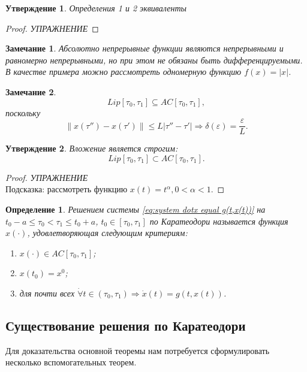 \documentclass[12pt, a4paper]{article}
\theoremstyle{rusdef}
\newtheorem{define}{Определение} %
\newtheorem{statement}{Утверждение}
\newtheorem{remark}{Замечание}
\newcommand\abs[1]{\left\lvert #1 \right\rvert} %
\newcommand{\norm}[1]{\left\lVert #1 \right\rVert} %
\begin{document}
\begin{statement}
Определения 1 и 2 эквиваленты
\end{statement}
\begin{proof}
\textit{УПРАЖНЕНИЕ}
\end{proof}

\begin{remark}
Абсолютно непрерывные функции являются непрерывными и равномерно непрерывными, но при этом не обязаны быть дифференцируемыми. В качестве примера можно рассмотреть одномерную функцию $f(x) = \abs{x}$.
\end{remark}

\begin{remark}
$$
Lip[\tau_0, \tau_1] \subseteq AC[\tau_0, \tau_1],
$$
поскольку
$$
\norm{x(\tau'') - x(\tau')} \leqslant L \abs{\tau'' - \tau'} \Rightarrow \delta(\varepsilon) = \frac{\varepsilon}{L}.
$$
\end{remark}

\begin{statement}
Вложение является строгим:
$$
Lip[\tau_0, \tau_1] \subset AC[\tau_0, \tau_1].
$$
\end{statement}
\begin{proof}
\textit{УПРАЖНЕНИЕ}\\
Подсказка: рассмотреть функцию $x(t) = t^{\alpha}, 0 < \alpha < 1$.
\end{proof}

\begin{define}
Решением системы \eqref{eq:system dotx equal g(t,x(t))} на $t_0 - a \leqslant \tau_0 < \tau_1 \leqslant t_0 + a$, $t_0 \in [\tau_0, \tau_1]$ по Каратеодори называется функция $x(\cdot)$, удовлетворяющая следующим критериям:
\begin{enumerate}
\item $x(\cdot) \in AC[\tau_0, \tau_1]$;
\item $x(t_0) = x^0$;
\item для почти всех $\dot{\forall} t \in (\tau_0, \tau_1) \Rightarrow \dot{x}(t) = g(t, x(t))$.
\end{enumerate}
\end{define}

\subsection*{Существование решения по Каратеодори}
Для доказательства основной теоремы нам потребуется сформулировать несколько вспомогательных теорем.
\end{document}
